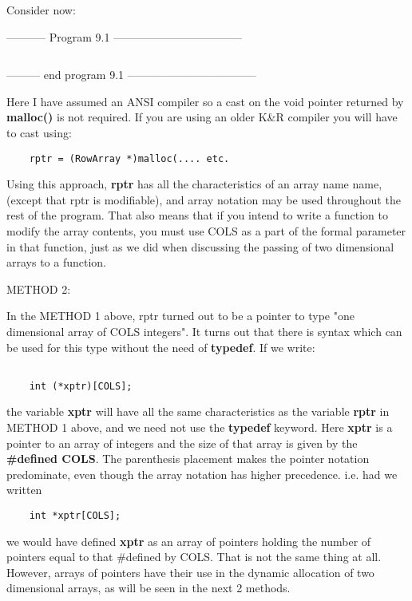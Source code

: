 Consider now:

-----------  Program 9.1  -----------------------------------
\inputminted[breaklines]{c}{../src/ch9-1.c}
--------- end program 9.1 -----------------------------------

Here I have assumed an ANSI compiler so a cast on the void pointer
returned by \textbf{malloc()} is not required. If you are using an older
K\&R compiler you will have to cast using:

\begin{verbatim}
    rptr = (RowArray *)malloc(.... etc.
\end{verbatim}

Using this approach, \textbf{rptr} has all the characteristics of an
array name name, (except that rptr is modifiable), and array notation
may be used throughout the rest of the program. That also means that if
you intend to write a function to modify the array contents, you must
use COLS as a part of the formal parameter in that function, just as we
did when discussing the passing of two dimensional arrays to a function.

METHOD 2:

In the METHOD 1 above, rptr turned out to be a pointer to type "one
dimensional array of COLS integers". It turns out that there is syntax
which can be used for this type without the need of \textbf{typedef}. If
we write:

\begin{verbatim}

    int (*xptr)[COLS];
\end{verbatim}

the variable \textbf{xptr} will have all the same characteristics as the
variable \textbf{rptr} in METHOD 1 above, and we need not use the
\textbf{typedef} keyword. Here \textbf{xptr} is a pointer to an array of
integers and the size of that array is given by the \textbf{\#defined
COLS}. The parenthesis placement makes the pointer notation predominate,
even though the array notation has higher precedence. i.e. had we
written

\begin{verbatim}
    int *xptr[COLS];
\end{verbatim}

we would have defined \textbf{xptr} as an array of pointers holding the
number of pointers equal to that \#defined by COLS. That is not the same
thing at all. However, arrays of pointers have their use in the dynamic
allocation of two dimensional arrays, as will be seen in the next 2
methods.

